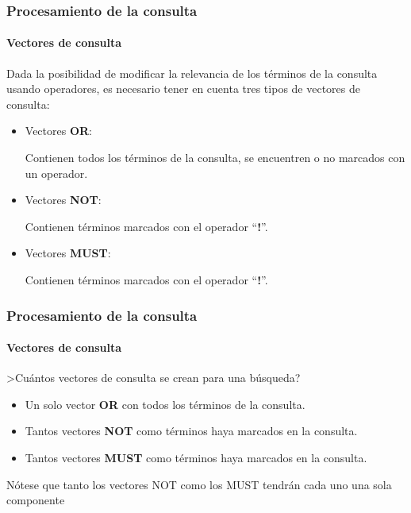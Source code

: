 \documentclass{beamer}
\begin{document}
\begin{frame}
    \frametitle{Procesamiento de la consulta}
    \framesubtitle{Vectores de consulta}
    Dada la posibilidad de modificar la relevancia de los t\'erminos de la consulta usando operadores, es necesario tener en cuenta tres tipos de vectores de consulta:
    \vspace{1mm}
    \begin{itemize}
        \item Vectores \textbf{OR}:
        
        \small Contienen todos los términos de la consulta, se encuentren o no marcados con un operador.
        \vspace{1mm}
        \item Vectores \textbf{NOT}:
        
        \small Contienen términos marcados con el operador “\textbf{!}”.
        \vspace{1mm}
        \item Vectores \textbf{MUST}:
        
        \small Contienen términos marcados con el operador “\textbf{!}”.
    \end{itemize}
\end{frame}
\begin{frame}
    \frametitle{Procesamiento de la consulta}
    \framesubtitle{Vectores de consulta}
    \centering 
    >Cu\'antos vectores de consulta se crean para una b\'usqueda?
    \vspace{5mm}
    \justifying
    \begin{itemize}
        \item Un solo vector \textbf{OR} con todos los t\'erminos de la consulta.
        \vspace{1mm}
        \item Tantos vectores \textbf{NOT} como t\'erminos haya marcados en la consulta.
        \vspace{1mm}
        \item Tantos vectores \textbf{MUST} como t\'erminos haya marcados en la consulta.
    \end{itemize}
    \vspace{1.6cm}
    \tiny *N\'otese que tanto los vectores NOT como los MUST tendr\'an cada uno una sola componente
\end{frame}
\end{document}
